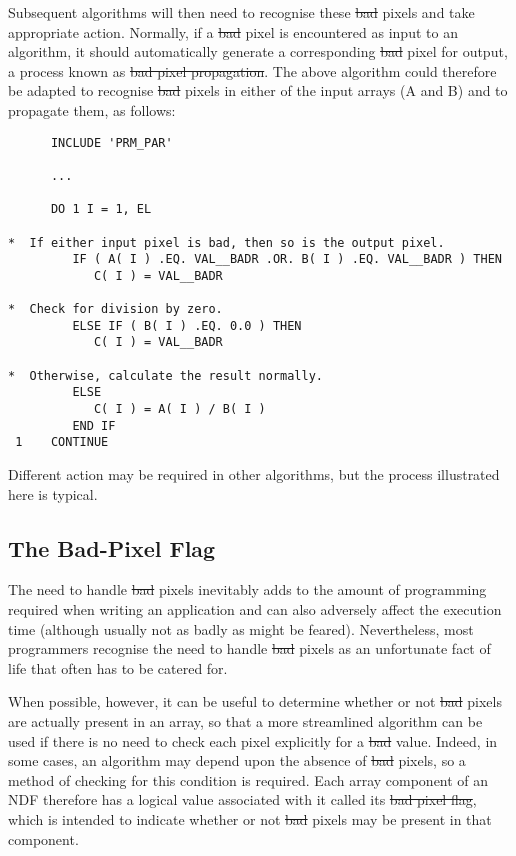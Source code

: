 Subsequent algorithms will then need to recognise these \st{bad\/} pixels and
take appropriate action. 
Normally, if a \st{bad\/} pixel is encountered as input to an algorithm, it 
should automatically generate a corresponding \st{bad\/} pixel for output, a 
process known as \st{bad pixel propagation}.
The above algorithm could therefore be adapted to recognise \st{bad\/} pixels
in either of the input arrays (A and B) and to propagate them, as follows: 

\small
\begin{verbatim}
      INCLUDE 'PRM_PAR'

      ...

      DO 1 I = 1, EL

*  If either input pixel is bad, then so is the output pixel.
         IF ( A( I ) .EQ. VAL__BADR .OR. B( I ) .EQ. VAL__BADR ) THEN
            C( I ) = VAL__BADR

*  Check for division by zero.
         ELSE IF ( B( I ) .EQ. 0.0 ) THEN
            C( I ) = VAL__BADR

*  Otherwise, calculate the result normally.
         ELSE
            C( I ) = A( I ) / B( I )
         END IF
 1    CONTINUE
\end{verbatim}
\normalsize

Different action may be required in other algorithms, but the process
illustrated here is typical. 

\subsection{\label{ss:noexplicitchecks}The Bad-Pixel Flag}

The need to handle \st{bad\/} pixels inevitably adds to the amount of
programming required when writing an application and can also adversely
affect the execution time (although usually not as badly as might be
feared). 
Nevertheless, most programmers recognise the need to handle \st{bad\/} pixels
as an unfortunate fact of life that often has to be catered for. 

When possible, however, it can be useful to determine whether or not
\st{bad\/} pixels are actually present in an array, so that a more
streamlined 
algorithm can be used if there is no need to check each pixel explicitly for
a \st{bad\/} value. 
Indeed, in some cases, an algorithm may depend upon the absence of \st{bad\/}
pixels, so a method of checking for this condition is required. 
Each array component of an NDF therefore has a logical value associated with
it called its \st{bad pixel flag}, which is intended to indicate whether or
not \st{bad\/} pixels may be present in that component. 

